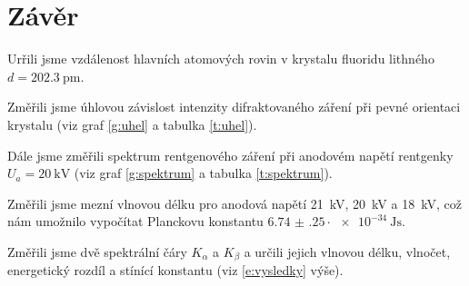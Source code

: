 \section*{Závěr}
Urřili jsme vzdálenost hlavních atomových rovin v krystalu fluoridu lithného $d = \SI{202.3}{\pico\metre}$.

Změřili jsme úhlovou závislost intenzity difraktovaného záření při pevné orientaci krystalu (viz graf \ref{g:uhel} a tabulka \ref{t:uhel}).

Dále jsme změřili spektrum rentgenového záření při anodovém napětí rentgenky $U_a = \SI{20}{\kV}$ (viz graf \ref{g:spektrum} a tabulka \ref{t:spektrum}).

Změřili jsme mezní vlnovou délku pro anodová napětí \SI{21}{\kV}, \SI{20}{\kV} a \SI{18}{\kV}, což nám umožnilo vypočítat Planckovu konstantu $\num{6.74(25)}\cdot \SI{e-34}{\joule\s}$.

Změřili jsme dvě spektrální čáry $K_\alpha$ a $K_\beta$ a určili jejich vlnovou délku, vlnočet, energetický rozdíl a stínící konstantu (viz \eqref{e:vysledky} výše).